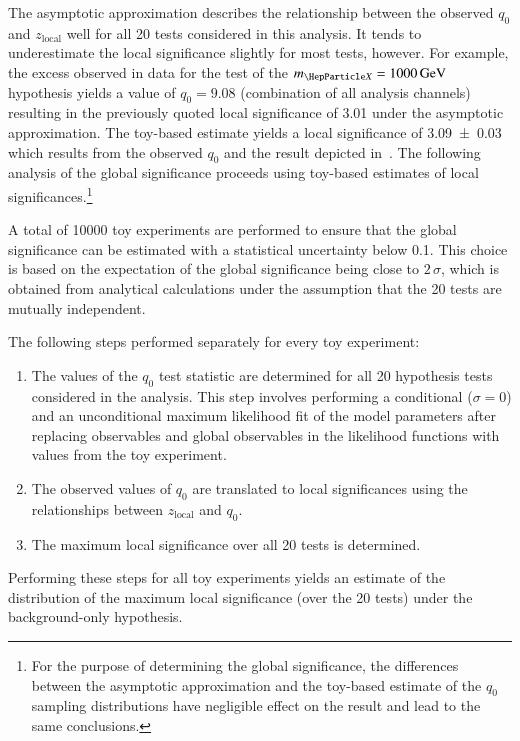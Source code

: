 The asymptotic approximation describes the relationship between the
observed $q_0$ and $z_{\text{local}}$ well for all 20 tests considered
in this analysis. It tends to underestimate the local significance
slightly for most tests, however. For example, the excess observed in
data for the test of the $\mX = \SI{1000}{\GeV}$ hypothesis yields a
value of $q_0 = \num{9.08}$ (combination of all analysis channels)
resulting in the previously quoted local significance of \num{3.01}
under the asymptotic approximation. The toy-based estimate yields a
local significance of \num{3.09 +- 0.03} which results from the
observed $q_0$ and the result depicted
in~. The following analysis of the
global significance proceeds using toy-based estimates of local
significances.\footnote{For the purpose of determining the global
  significance, the differences between the asymptotic approximation
  and the toy-based estimate of the $q_0$ sampling distributions have
  negligible effect on the result and lead to the same conclusions.}

A total of \num{10000} toy experiments are performed to ensure that
the global significance can be estimated with a statistical
uncertainty below \num{0.1}. This choice is based on the expectation
of the global significance being close to $2\,\sigma$, which is obtained
from analytical calculations under the assumption that the 20 tests
are mutually independent.

The following steps performed separately for every toy experiment:
\begin{enumerate}

\item The values of the $q_0$ test statistic are determined for all 20
  hypothesis tests considered in the analysis. This step involves
  performing a conditional ($\sigma = 0$) and an unconditional maximum
  likelihood fit of the model parameters after replacing observables
  and global observables in the likelihood functions with values from
  the toy experiment.

\item The observed values of $q_0$ are translated to local
  significances using the relationships between $z_{\text{local}}$ and
  $q_0$.

\item The maximum local significance over all 20 tests is determined.

\end{enumerate}
Performing these steps for all toy experiments yields an estimate of
the distribution of the maximum local significance (over the 20 tests)
under the background-only hypothesis.

